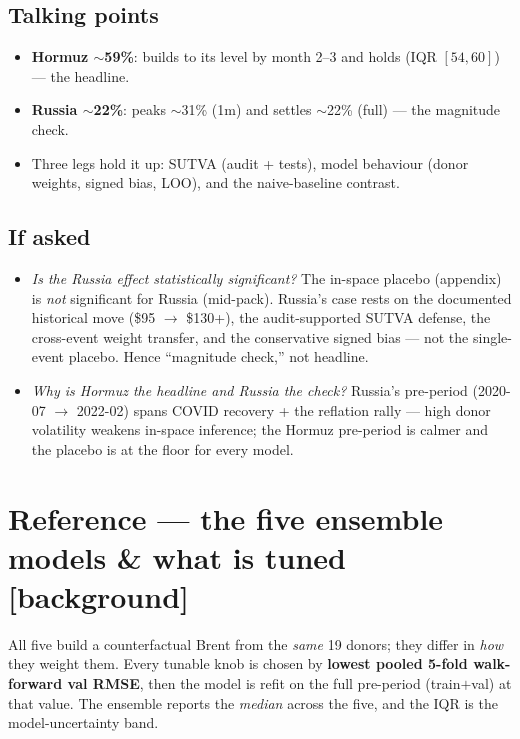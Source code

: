 \documentclass[11pt,a4paper]{article}
\newcommand{\timetag}[1]{\hfill\textcolor{muted}{\small[#1]}}
\newcommand{\highlight}[1]{\textcolor{accent}{\textbf{#1}}}
\begin{document}
\subsection{Talking points}
\begin{itemize}
  \item \highlight{Hormuz $\sim$59\%}: builds to its level by month 2--3 and holds (IQR $[54,60]$) --- the headline.
  \item \highlight{Russia $\sim$22\%}: peaks $\sim$31\% (1m) and settles $\sim$22\% (full) --- the magnitude check.
  \item Three legs hold it up: SUTVA (audit + tests), model behaviour (donor weights, signed bias, LOO),
    and the naive-baseline contrast.
\end{itemize}

\subsection{If asked}
\begin{itemize}
  \item \textit{Is the Russia effect statistically significant?} The in-space placebo (appendix) is
    \emph{not} significant for Russia (mid-pack). Russia's case rests on the documented historical move
    (\$95 $\to$ \$130+), the audit-supported SUTVA defense, the cross-event weight transfer, and the
    conservative signed bias --- not the single-event placebo. Hence ``magnitude check,'' not headline.
  \item \textit{Why is Hormuz the headline and Russia the check?} Russia's pre-period (2020-07 $\to$
    2022-02) spans COVID recovery + the reflation rally --- high donor volatility weakens in-space
    inference; the Hormuz pre-period is calmer and the placebo is at the floor for every model.
\end{itemize}

\section{Reference --- the five ensemble models \& what is tuned \timetag{background}}

All five build a counterfactual Brent from the \emph{same} 19 donors; they differ in \emph{how} they
weight them. Every tunable knob is chosen by \highlight{lowest pooled 5-fold walk-forward val RMSE}, then
the model is refit on the full pre-period (train$+$val) at that value. The ensemble reports the
\emph{median} across the five, and the IQR is the model-uncertainty band.
\end{document}
